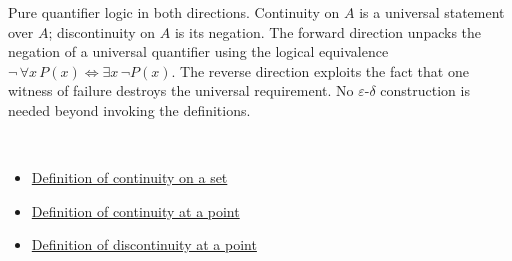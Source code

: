 \begin{remark*}
Pure quantifier logic in both directions. Continuity on $A$ is a universal statement over $A$; discontinuity on $A$ is its negation. The forward direction unpacks the negation of a universal quantifier using the logical equivalence $\lnot\,\forall x\,P(x) \iff \exists x\,\lnot P(x)$. The reverse direction exploits the fact that one witness of failure destroys the universal requirement. No $\varepsilon$-$\delta$ construction is needed beyond invoking the definitions.
\end{remark*}

\begin{remark*}[Dependencies]~\\
\begin{itemize}
  \item \hyperref[def:continuity-on-set]{Definition of continuity on a set}
  \item \hyperref[def:continuous-at-point]{Definition of continuity at a point}
  \item \hyperref[def:discontinuity-at-point]{Definition of discontinuity at a point}
\end{itemize}
\end{remark*}
